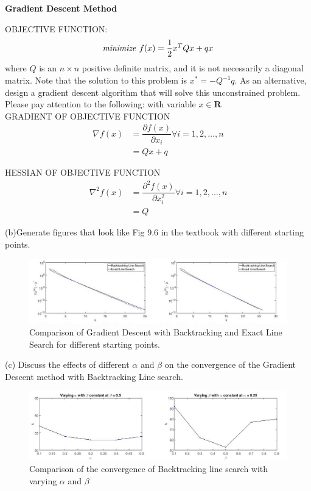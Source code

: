 \begin{prob}[1]\textbf{Gradient Descent Method}\\
\end{prob}
OBJECTIVE FUNCTION:
\[
\mbox{\textit{minimize }} f(x) = \dfrac{1}{2}x^{T}Qx + q x
\]
  where $Q$ is an $n \times n$ positive definite matrix, and it is not
  necessarily a diagonal matrix. Note that the solution to this problem
  is $x^{*} = -Q^{-1}q$. As an alternative, design a gradient descent
  algorithm that will solve this unconstrained problem. Please pay attention
  to the following:
  with variable $x \in \mathbf{R}$\\

GRADIENT OF OBJECTIVE FUNCTION
\begin{eqnarray*}
\nabla f(x) &= \dfrac{\partial f(x)}{\partial x_{i}} \forall i = 1,2,\ldots,n\\
 &= Qx + q
\end{eqnarray*}

HESSIAN OF OBJECTIVE FUNCTION
\begin{eqnarray*}
\nabla^{2} f(x) &= \dfrac{\partial^{2} f(x)}{\partial x_{i}^{2}} \forall i = 1,2,\ldots,n\\
 &= Q
\end{eqnarray*}



(b)Generate figures that look like Fig 9.6 in the textbook with different starting points.
  \begin{figure}[h!]
  \centering
\includegraphics[width=\textwidth]{source/prob1/figu1}
\caption{Comparison of Gradient Descent with Backtracking and Exact Line Search for different starting points.}
\end{figure}

(c) Discuss the effects of different $\alpha$ and $\beta$ on the convergence of the Gradient Descent method with Backtracking Line search.\\

\begin{figure}[h!]
  \centering
\includegraphics[width=\textwidth]{source/prob1/figu2}
\caption{Comparison of the convergence of Backtracking line search with varying $\alpha$ and $\beta$}
\end{figure}


